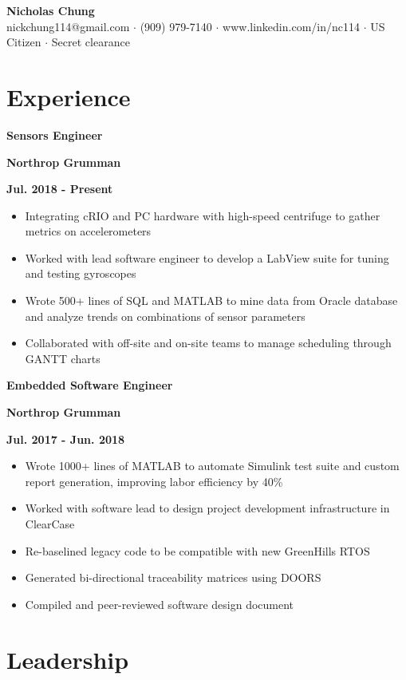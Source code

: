 \documentclass[12pt]{article}
\newcommand\textbox[1]{\parbox{.333\textwidth}{#1}}
\newcommand{\textlcr}[3]{\textbox{\textbf{#1}\hfill}\textbox{\hfil \textbf{#2}\hfil}\textbox{\hfill \textbf{#3}}}
\begin{document}
\begin{center}
	\textbf{\LARGE Nicholas Chung} \\ \vspace{.5ex}
	nickchung114@gmail.com $\cdot$ (909) 979-7140 $\cdot$ www.linkedin.com/in/nc114 $\cdot$ US Citizen $\cdot$ Secret clearance
\end{center}

\vspace{-8pt}
\smallskip

\section*{Experience}
\vspace*{-1em}\makebox[\linewidth]{\rule{\textwidth}{0.4pt}}

\textlcr{Sensors Engineer}{Northrop Grumman}{Jul. 2018 - Present}
\begin{itemize}
\item Integrating cRIO and PC hardware with high-speed centrifuge to gather metrics on accelerometers
\item Worked with lead software engineer to develop a LabView suite for tuning and testing gyroscopes
\item Wrote 500+ lines of SQL and MATLAB to mine data from Oracle database and analyze trends on combinations of sensor parameters
\item Collaborated with off-site and on-site teams to manage scheduling through GANTT charts
\end{itemize}

\bigskip
\textlcr{Embedded Software Engineer}{Northrop Grumman}{Jul. 2017 - Jun. 2018}
\begin{itemize}
\item Wrote 1000+ lines of MATLAB to automate Simulink test suite and custom report generation, improving labor efficiency by 40\%
\item Worked with software lead to design project development infrastructure in ClearCase
\item Re-baselined legacy code to be compatible with new GreenHills RTOS
\item Generated bi-directional traceability matrices using DOORS
\item Compiled and peer-reviewed software design document
\end{itemize}

\section*{Leadership}
\vspace*{-1em}\makebox[\linewidth]{\rule{\textwidth}{0.4pt}}
\end{document}
